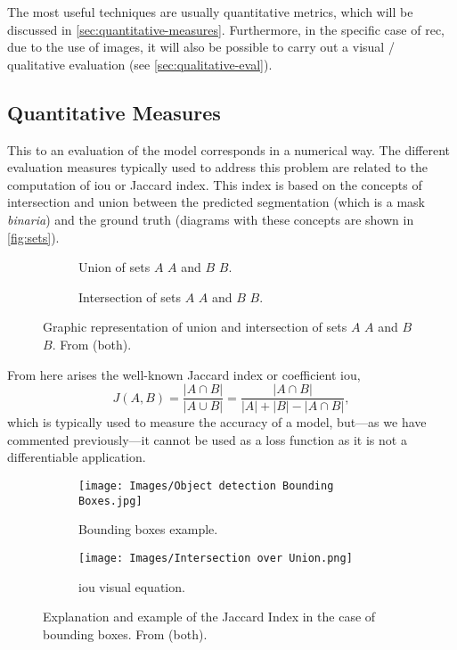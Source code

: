 The most useful techniques are usually quantitative metrics, which will be
discussed in \vref{sec:quantitative-measures}. Furthermore, in the specific
case of \gls{rec}, due to the use of images, it will also be possible to carry
out a visual / qualitative evaluation (see \vref{sec:qualitative-eval}).


\subsection{Quantitative Measures}\label{sec:quantitative-measures}

This to an evaluation of the model corresponds in a numerical way. The
different evaluation measures typically used to address this problem are
related to the computation of \gls{iou} or Jaccard index. This index is based
on the concepts of intersection and union between the predicted segmentation
(which is a mask \emph{binaria}) and the ground truth (diagrams with these
concepts are shown in \vref{fig:sets}).

\begin{figure}[ht]
  \begin{subfigure}[t]{.5\textwidth}
    \centering
    \caption{Union of sets \(A\) \(A\) and \(B\) \(B\).}
    
  \end{subfigure}
  \begin{subfigure}[t]{.5\textwidth}
    \centering
    \caption{Intersection of sets \(A\) \(A\) and \(B\) \(B\).}
    
  \end{subfigure}
  \caption[Union and intersection of sets \(A\) \(A\) and \(B\) \(B\)]{Graphic
    representation of union and intersection of sets \(A\) \(A\) and \(B\)
    \(B\). From  (both).}\label{fig:sets}
\end{figure}

From here arises the well-known Jaccard index or coefficient \gls{iou},
\begin{equation}
  J(A,B) = \frac{|A \cap B|}{|A \cup B|} =
  \frac{|A \cap B|}{|A| + |B| - |A \cap B|},
\end{equation}
which is typically used to measure the accuracy of a model, but---as we have
commented previously---it cannot be used as a loss function as it is not a
differentiable application.

\begin{figure}[ht]
  \begin{subfigure}[t]{.45\textwidth}
    \centering
    \caption{Bounding boxes example.}
    \texttt{[image: Images/Object detection Bounding Boxes.jpg]}
  \end{subfigure}\hfill
  \begin{subfigure}[t]{.45\textwidth}
    \centering
    \caption{\gls{iou} visual equation.}
    \texttt{[image: Images/Intersection over Union.png]}
  \end{subfigure}
  \caption[Jaccard Index explanation]{Explanation and example of the Jaccard
    Index in the case of bounding boxes. From
     (both).}
\end{figure}

